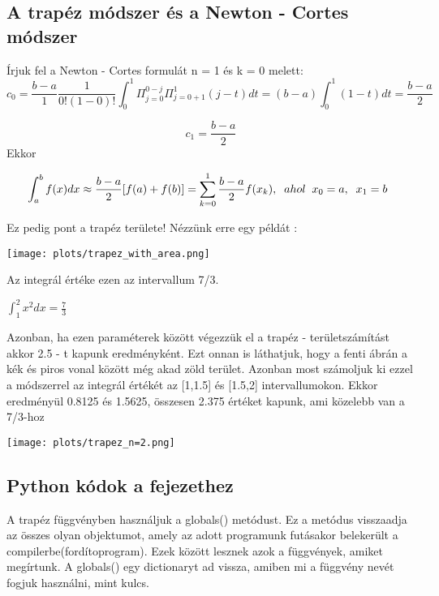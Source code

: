 \documentclass{article}
\theoremstyle{definition}
\theoremstyle{theorem}
\begin{document}
\subsection{A trapéz módszer és a Newton - Cortes módszer}
Írjuk fel a Newton - Cortes formulát n = 1 és k = 0 melett:
\begin{equation*}
c_0 = \frac{b-a}{1} \frac{1}{0!(1-0)!} \int_0^{1} \Pi_{j=0}^{0-j} \Pi_{j=0+1}^{1} (j-t) dt = (b-a) \int_0^1 (1-t) dt = \frac{b-a}{2}
\end{equation*}

\begin{equation*}
c_1 = \frac{b-a}{2}
\end{equation*}
Ekkor 

\begin{equation*}
    \int_a^b f(x) dx \approx \frac{b-a}{2}[f(a) + f(b)] = \sum_{k=0}^{1} \frac{b-a}{2} f(x_k),\\
    \;\;ahol \;\;x_0 = a,\;\;x_1=b
    \;\;
\end{equation*}

Ez pedig pont a trapéz területe! Nézzünk erre egy példát :
\newline

\texttt{[image: plots/trapez\_with\_area.png]}

Az integrál értéke ezen az intervallum 7/3. 
\begin{center}
$\int_{1}^{2} x ^2 dx = \frac{7}{3}$
\end{center}
Azonban, ha ezen paraméterek között végezzük el a trapéz - területszámítást akkor 2.5 - t kapunk eredményként. Ezt onnan is láthatjuk, hogy a fenti ábrán a kék és piros vonal között még akad zöld terület. Azonban most számoljuk ki ezzel a módszerrel az integrál értékét az [1,1.5] és [1.5,2] intervallumokon. Ekkor eredményül 0.8125 és 1.5625, összesen 2.375 értéket kapunk, ami közelebb van a 7/3-hoz

\texttt{[image: plots/trapez\_n=2.png]}

\subsection{Python kódok a fejezethez}
A trapéz függvényben használjuk a globals() metódust. Ez a metódus visszaadja az összes olyan objektumot, amely az adott programunk futásakor belekerült a compilerbe(fordítoprogram). Ezek között lesznek azok a függvények, amiket megírtunk. A globals() egy dictionaryt ad vissza, amiben mi a függvény nevét fogjuk használni, mint kulcs.
\pagebreak

\end{document}
